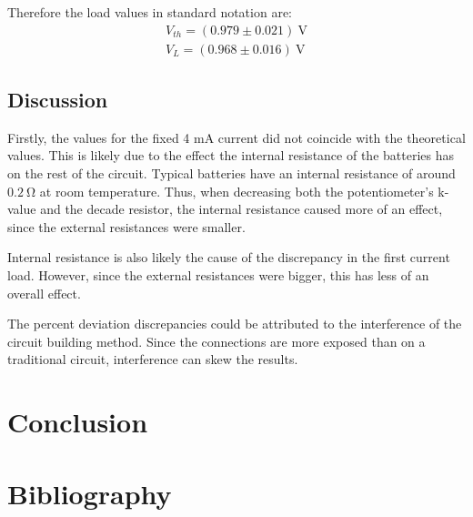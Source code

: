\documentclass[a4paper]{article}
\newcommand{\unit}[1]{~\mathrm{#1}}
\begin{document}
Therefore the load values in standard notation are:
\begin{gather*}
    V_{th} = (0.979 \pm 0.021)\unit{V}\\
    V_L = (0.968 \pm 0.016)\unit{V}
\end{gather*}
\subsection{Discussion}
Firstly, the values for the fixed 4 mA current did not coincide with the
theoretical values. This is likely due to the effect the internal resistance of
the batteries has on the rest of the circuit. Typical batteries have an internal
resistance of around $0.2\unit{\Omega}$ at room temperature\cite{ir}. Thus, when
decreasing both the potentiometer's k-value and the decade resistor, the
internal resistance caused more of an effect, since the external resistances
were smaller. 

Internal resistance is also likely the cause of the discrepancy in the first
current load. However, since the external resistances were bigger, this has less
of an overall effect.

The percent deviation discrepancies could be attributed to the interference
of the circuit building method. Since the connections are more exposed than
on a traditional circuit, interference can skew the results. 
\section{Conclusion}
\section{Bibliography}


\end{document}

